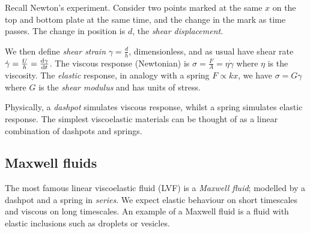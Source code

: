 \documentclass{jknotes}
\newcommand{\srate}{\dot{\gamma}}
\begin{document}
Recall Newton's experiment. Consider two points marked at the same $x$ on the
top and bottom plate at the same time, and the change in the mark as time
passes. The change in position is $d$, the \emph{shear displacement}.
\begin{center}
\end{center}

We then define \emph{shear strain} $\gamma = \frac{d}{h}$, dimensionless, and
as usual have shear rate $\srate = \frac{U}{h} = \frac{\diffd \gamma}{\diffd
t}$. The viscous response (Newtonian) is $\sigma = \frac{F}{A} = \eta \srate$
where $\eta$ is the viscosity. The \emph{elastic} response, in analogy with a
spring $F \propto kx$, we have $\sigma = G \gamma$ where $G$ is the
\emph{shear modulus} and has units of stress.

Physically, a \emph{dashpot} simulates viscous response, whilst a spring
simulates elastic response. The simplest viscoelastic materials can be thought
of as a linear combination of dashpots and springs.

\subsection{Maxwell fluids}
The most famous linear viscoelastic fluid (LVF) is a \emph{Maxwell fluid};
modelled by a dashpot and a spring in \emph{series}. We expect elastic
behaviour on short timescales and viscous on long timescales. An example of a
Maxwell fluid is a fluid with elastic inclusions such as droplets or vesicles.

\begin{center}
\end{center}
\end{document}
